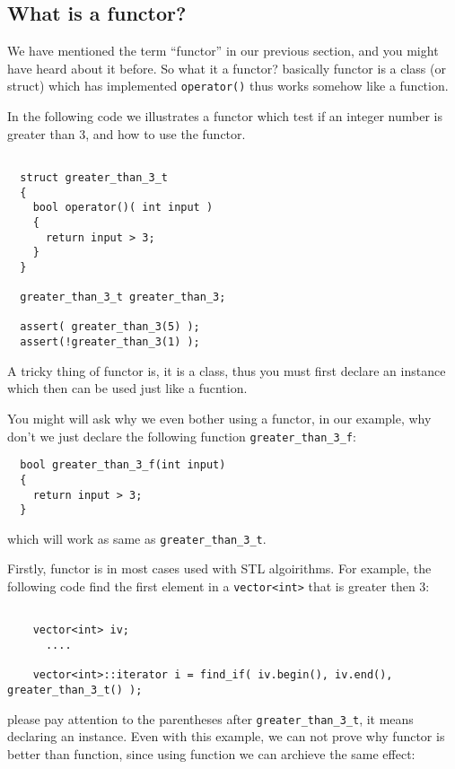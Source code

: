 \documentclass[letterpaper]{book}
\begin{document}
\subsection*{What is a functor?}
  We have mentioned the term ``functor'' in our previous section, and you might
have heard about it before. So what it a functor? basically functor is a class
(or struct) which has implemented \lstinline$operator()$ thus works somehow like
a function.

  In the following code we illustrates a functor which test if an integer number
is greater than 3, and how to use the functor.

\begin{lstlisting}

  struct greater_than_3_t
  {
    bool operator()( int input )
    {
      return input > 3;
    }
  }

  greater_than_3_t greater_than_3;

  assert( greater_than_3(5) );
  assert(!greater_than_3(1) );

\end{lstlisting}

  A tricky thing of functor is, it is a class, thus you must first declare an instance
which then can be used just like a fucntion. 

  You might will ask why we even bother using a functor, in our example, why don't we 
just declare the following function \lstinline$greater_than_3_f$:

\begin{lstlisting}
  bool greater_than_3_f(int input)
  {
    return input > 3;
  }
\end{lstlisting}

which will work as same as \lstinline$greater_than_3_t$.

Firstly, functor is in most cases used with STL algoirithms. For example, the following
code find the first element in a \lstinline$vector<int>$ that is greater then 3:

\begin{lstlisting}
  
    vector<int> iv;
      ....

    vector<int>::iterator i = find_if( iv.begin(), iv.end(), greater_than_3_t() );

\end{lstlisting}

please pay attention to the parentheses after \lstinline$greater_than_3_t$, it means
declaring an instance. Even with this example, we can not prove why functor is better
than function, since using function we can archieve the same effect:
\end{document}

